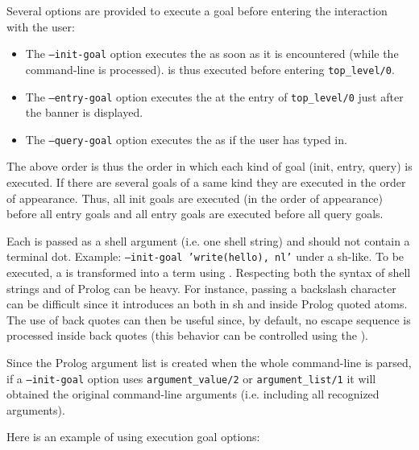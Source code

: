 Several options are provided to execute a goal before entering the
interaction with the user:

\begin{itemize}

\item The \texttt{--init-goal} option executes the  as soon as
it is encountered (while the command-line is processed).  is thus
executed before entering \texttt{top\_level/0}.

\item The \texttt{--entry-goal} option executes the  at the
entry of \texttt{top\_level/0} just after the banner is displayed.

\item The \texttt{--query-goal} option executes the  as if the 
user has typed in.

\end{itemize}

The above order is thus the order in which each kind of goal (init, entry,
query) is executed.  If there are several goals of a same kind they are
executed in the order of appearance. Thus, all init goals are executed (in the
order of appearance) before all entry goals and all entry goals are executed
before all query goals.

Each  is passed as a shell argument (i.e. one shell string) and
should not contain a terminal dot. Example:
\texttt{--init-goal 'write(hello), nl'} under a sh-like.
To be executed, a  is transformed into a term using
. Respecting both
the syntax of shell strings and of Prolog can be heavy. For
instance, passing a backslash character \texttt{{\bs}} can be difficult
since it introduces an  both in sh and inside Prolog
quoted atoms. The use of back quotes can then be useful since, by default, no
escape sequence is processed inside back quotes (this behavior can be
controlled using the   ).


Since the Prolog argument list is created when the whole command-line is
parsed, if a \texttt{--init-goal} option uses \texttt{argument\_value/2} or
\texttt{argument\_list/1} it will obtained the original command-line
arguments (i.e. including all recognized arguments). 

Here is an example of using execution goal options:

